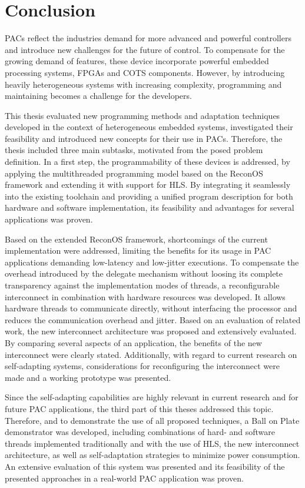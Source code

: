 \chapter{Conclusion}
\label{sec:conclusion}
\aclp{PAC} reflect the industries demand for more advanced and powerful
controllers and introduce new challenges for the future of control. To
compensate for the growing demand of features, these device incorporate
powerful embedded processing systems, \acp{FPGA} and \ac{COTS} components.
However, by introducing heavily heterogeneous systems with increasing
complexity, programming and maintaining becomes a challenge for the
developers.

This thesis evaluated new programming methods and adaptation
techniques developed in the context of heterogeneous embedded systems,
investigated their feasibility and introduced new concepts for their use in
\acp{PAC}. Therefore, the thesis included three main subtasks, motivated from
the posed problem definition. In a first step, the programmability of these
devices is addressed, by applying the multithreaded programming model based on
the ReconOS framework and extending it with support for \ac{HLS}. By
integrating it seamlessly into the existing toolchain and providing a unified
program description for both hardware and software implementation, its
feasibility and advantages for several applications was proven.

Based on the extended ReconOS framework, shortcomings of the current
implementation were addressed, limiting the benefits for its usage in
\ac{PAC} applications demanding low-latency and low-jitter executions. To
compensate the overhead introduced by the delegate mechanism without loosing
its complete transparency against the implementation modes of threads, a
reconfigurable interconnect in combination with hardware resources was
developed. It allows hardware threads to communicate directly, without
interfacing the processor and reduces the communication overhead and jitter.
Based on an evaluation of related work, the new interconnect architecture was
proposed and extensively evaluated. By comparing several aspects of an
application, the benefits of the new interconnect were clearly stated.
Additionally, with regard to current research on self-adapting systems,
considerations for reconfiguring the interconnect were made and a working
prototype was presented.

Since the self-adapting capabilities are highly relevant in current research
and for future \ac{PAC} applications, the third part of this theses addressed
this topic. Therefore, and to demonstrate the use of all proposed techniques,
a Ball on Plate demonstrator was developed, including combinations of hard-
and software threads implemented traditionally and with the use of
\ac{HLS}, the new interconnect architecture, as well as self-adaptation
strategies to minimize power consumption. An extensive evaluation of this
system was presented and its feasibility of the presented approaches in a
real-world \ac{PAC} application was proven.

